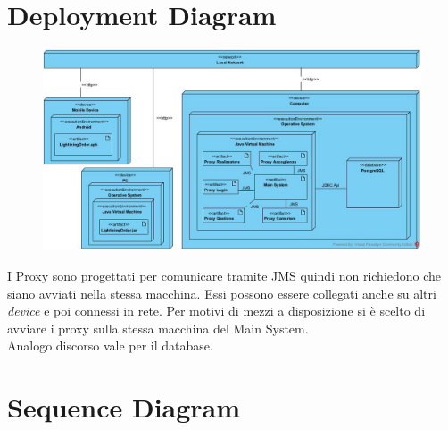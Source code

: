 \section{Deployment Diagram}
\begin{figure}[H]
	\centering
	\includegraphics[width=1\textwidth]{Immagini/deploy.jpg}
\end{figure}
I Proxy sono progettati per comunicare tramite JMS quindi non richiedono che siano avviati nella stessa macchina. Essi possono essere collegati anche su altri \textit{device} e poi connessi in rete. Per motivi di mezzi a disposizione si è scelto di avviare i proxy sulla stessa macchina del Main System.
\\Analogo discorso vale per il database.

\section{Sequence Diagram}